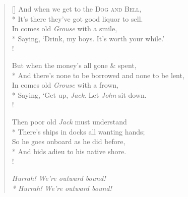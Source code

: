\begin{verse}[\versewidth]
And when we get to the \textsc{Dog and Bell},\\*
It's there they've got good liquor to sell.\\
In comes old \textit{Grouse} with a smile,\\*
Saying, `Drink, my boys. It's worth your while.'\\!

But when the money's all gone \& spent,\\*
And there's none to be borrowed and none to be lent,\\
In comes old \textit{Grouse} with a frown,\\*
Saying, `Get up, \textit{Jack}. Let \textit{John} sit down.\\!

Then poor old \textit{Jack} must understand\\*
There's ships in docks all wanting hands;\\
So he goes onboard as he did before,\\*
And bids adieu to his native shore.\\!

{\itshape 
Hurrah! We're outward bound!\\*
Hurrah! We're outward bound!}
\end{verse}